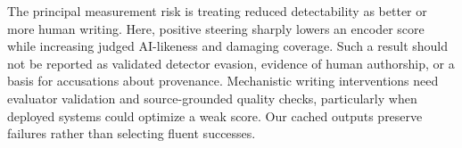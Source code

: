 The principal measurement risk is treating reduced detectability as better or more human writing. Here, positive steering sharply lowers an encoder score while increasing judged AI-likeness and damaging coverage. Such a result should not be reported as validated detector evasion, evidence of human authorship, or a basis for accusations about provenance. Mechanistic writing interventions need evaluator validation and source-grounded quality checks, particularly when deployed systems could optimize a weak score. Our cached outputs preserve failures rather than selecting fluent successes.
